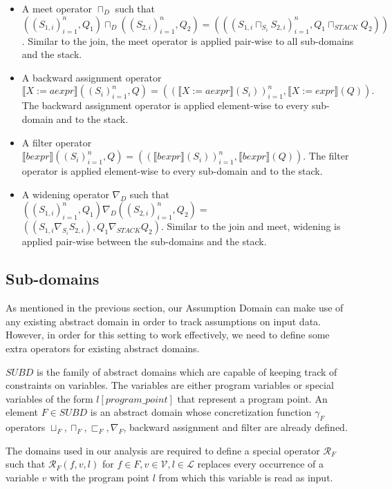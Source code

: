 \documentclass[]{report}
\begin{document}
\begin{itemize}
	\item A meet operator $\sqcap_{D}$ such that $ ((S_{1,i})_{i=1}^{n}, Q_{1}) \sqcap_{D} ((S_{2,i})_{i=1}^{n}, Q_{2}) = (((S_{1,i} \sqcap_{S_{i}} S_{2,i})_{i=1}^{n}, Q_{1} \sqcap_{STACK} Q_{2}))$. Similar to the join, the meet operator is applied pair-wise to all sub-domains and the stack.
	\item A backward assignment operator $\llbracket X:=aexpr \rrbracket ((S_{i})_{i=1}^{n}, Q) =  ((\llbracket X:=aexpr \rrbracket(S_{i}))_{i=1}^{n}, \llbracket X:= expr \rrbracket(Q)).$ The backward assignment operator is applied element-wise to every sub-domain and to the stack. 
	\item A filter operator $ \llbracket bexpr \rrbracket ((S_{i})_{i=1}^{n}, Q) =  ((\llbracket bexpr \rrbracket(S_{i}))_{i=1}^{n}, \llbracket bexpr \rrbracket(Q)). $ The filter operator is applied element-wise to every sub-domain and to the stack.
	\item A widening operator $\nabla_{D}$ such that $ ((S_{1,i})_{i=1}^{n}, Q_{1}) \nabla_{D} ((S_{2,i})_{i=1}^{n}, Q_{2}) = $ $ ((S_{1, i} \nabla_{S_{i}} S_{2,i}), Q_{1} \nabla_{STACK} Q_{2}) .$ Similar to the join and meet, widening is applied pair-wise between the sub-domains and the stack. 
\end{itemize}

\subsection{Sub-domains} \label{sub-domains}

As mentioned in the previous section, our Assumption Domain can make use of any existing abstract domain in order to track assumptions on input data. However, in order for this setting to work effectively, we need to define some extra operators for existing abstract domains. 

$SUBD$ is the family of abstract domains which are capable of keeping track of constraints on variables. The variables are either program variables or special variables of the form $ l[program\_point] $ that represent a program point. An element $F \in SUBD$ is an abstract domain whose concretization function $\gamma_{F}$ operators $\sqcup_{F}, \sqcap_{F}, \sqsubset_{F}, \nabla_{F}$, backward assignment and filter are already defined.

The domains used in our analysis are required to define a special operator $ \mathcal{R}_{F} $ such that $ \mathcal{R}_{F}(f, v, l) $ for $ f \in F, v \in \mathcal{V}, l \in \mathcal{L} $ replaces every occurrence of a variable $ v $ with the program point $ l $ from which this variable is read as input. 
\end{document}
